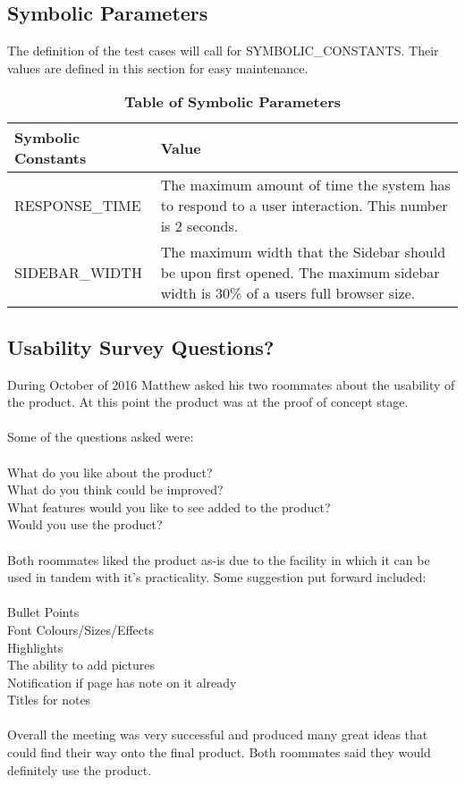 \documentclass[12pt, titlepage]{article}
\begin{document}
\subsection{Symbolic Parameters}

The definition of the test cases will call for SYMBOLIC\_CONSTANTS.
Their values are defined in this section for easy maintenance.

\begin{table}[!htbp]
	\caption{\textbf{Table of Symbolic Parameters}} \label{Table}
	
	\begin{tabularx}{\textwidth}{p{5cm}X}
		\toprule
		\textbf{Symbolic Constants} & \textbf{Value}\\
		\midrule
		RESPONSE\_TIME & The maximum amount of time the system has to respond to a 
		user interaction. This number is 2 seconds.  \\
		SIDEBAR\_WIDTH & The maximum width that the Sidebar should be upon first 
		opened. The maximum sidebar width is 30\% of a users full browser size.\\
		\bottomrule
	\end{tabularx}
	
\end{table}	

\subsection{Usability Survey Questions?}

During October of 2016 Matthew asked his two roommates about the usability of the 
product. At this point the product was at the proof of concept stage. \\
\\
Some of the questions asked were:\\
\\
What do you like about the product?\\
What do you think could be improved?\\
What features would you like to see added to the product?\\
Would you use the product?\\
\\
Both roommates liked the product as-is due to the facility in which it can be used in 
tandem with it's practicality. Some suggestion put forward included:\\
\\
Bullet Points\\
Font Colours/Sizes/Effects\\
Highlights\\
The ability to add pictures\\
Notification if page has note on it already\\
Titles for notes\\
\\
Overall the meeting was very successful and produced many great ideas that could find 
their way onto the final product. Both roommates said they would definitely use the 
product. 
\end{document}
